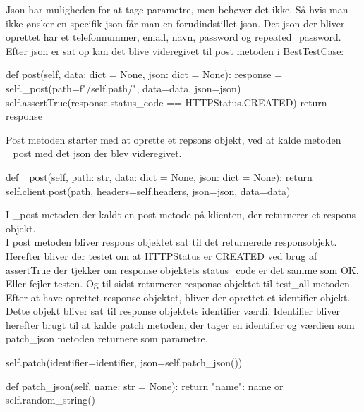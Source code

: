 Json har muligheden for at tage parametre, men behøver det ikke. Så hvis man ikke ønsker en specifik json får man en forudindstillet json. Det json der bliver oprettet har et telefonnummer, email, navn, password og repeated\_password.
Efter json er sat op kan det blive videregivet til post metoden i BestTestCase:\\

\begin{code}[language=python, caption=BestTestCase.py, firstnumber=65]
def post(self, data: dict = None, json: dict = None):
    response = self._post(path=f"/{self.path}/", data=data, json=json)
    self.assertTrue(response.status_code == HTTPStatus.CREATED)
    return response
\end{code}

Post metoden starter med at oprette et repsons objekt, ved at kalde metoden \_post med det json der blev videregivet. \\

\begin{code}[language=python, caption=BestTestCase.py, firstnumber=40]
def _post(self, path: str, data: dict = None, json: dict = None):
    return self.client.post(path, headers=self.headers, json=json, data=data)
\end{code}

I \_post metoden der kaldt en post metode på klienten, der returnerer et respons objekt.\\
I post metoden bliver respons objektet sat til det returnerede responsobjekt. Herefter bliver der testet om at HTTPStatus er CREATED ved brug af assertTrue der tjekker om response objektets status\_code er det samme som OK. Eller fejler testen. Og til sidst returnerer response objektet til test\_all metoden.\\

Efter at have oprettet response objektet, bliver der oprettet et identifier objekt. Dette objekt bliver sat til response objektets identifier værdi. Identifier bliver herefter brugt til at kalde patch metoden, der tager en identifier og værdien som patch\_json metoden returnere som parametre. \\

\begin{code}[language=python, caption=UsersTest.py, firstnumber=14]
self.patch(identifier=identifier, json=self.patch_json())
\end{code}

\begin{code}[language=python, caption=UserTest.py, firstnumber=29]
def patch_json(self, name: str = None):
    return {
        "name": name or self.random_string()
    }
\end{code}

